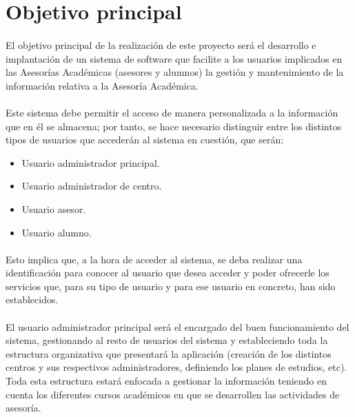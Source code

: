 \section{Objetivo principal}

\paragraph{}El objetivo principal de la realización de este proyecto será el
desarrollo e implantación de un sistema de software que facilite a los usuarios
implicados en las Asesorías Académicas (asesores y alumnos) la gestión y
mantenimiento de la información relativa a la Asesoría Académica.

\paragraph{}Este sistema debe permitir el acceso de manera personalizada a la
información que en él se almacena; por tanto, se hace necesario distinguir entre
los distintos tipos de usuarios que accederán al sistema en cuestión, que serán:

\begin{itemize}
 \item Usuario administrador principal.
 \item Usuario administrador de centro.
 \item Usuario asesor.
 \item Usuario alumno.
\end{itemize}

\paragraph{}Esto implica que, a la hora de acceder al sistema, se deba realizar
una identificación para conocer al usuario que desea acceder y poder ofrecerle
los servicios que, para su tipo de usuario y para ese usuario en concreto, han
sido establecidos.

\paragraph{}El usuario administrador principal será el encargado del buen
funcionamiento del sistema, gestionando al resto de usuarios del sistema y
estableciendo toda la estructura organizativa que presentará la aplicación
(creación de los distintos centros y sus respectivos administradores, definiendo
los planes de estudios, etc). Toda esta estructura estará enfocada a gestionar
la información teniendo en cuenta los diferentes cursos académicos en que se
desarrollen las actividades de asesoría.

